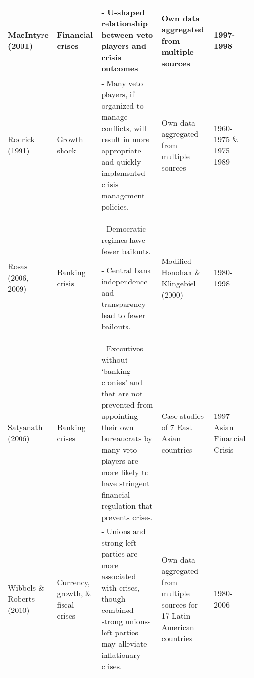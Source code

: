 \begin{tabular}{ m{2.5cm} m{1.75cm} m{6.25cm} m{2.5cm} m{1.75cm}}
    MacIntyre (2001) & Financial crises & - U-shaped relationship between veto players and crisis outcomes & Own data aggregated from multiple sources & 1997-1998 \\[0.25cm]\hline

    Rodrick (1991) & Growth shock & - Many veto players, if organized to manage conflicts, will result in more appropriate and quickly implemented crisis management policies. & Own data aggregated from multiple sources & 1960-1975 \& 1975-1989 \\[0.25cm]\hline

    Rosas (2006, 2009) & Banking crisis & - Democratic regimes have fewer bailouts.

    - Central bank independence and transparency lead to fewer bailouts. & Modified Honohan \& Klingebiel (2000) & 1980-1998 \\[0.25cm]\hline

    Satyanath (2006) & Banking crises & - Executives without `banking cronies' and that are not prevented from appointing their own bureaucrats by many veto players are more likely to have stringent financial regulation that prevents crises. & Case studies of 7 East Asian countries & 1997 Asian Financial Crisis \\[0.25cm]\hline

    Wibbels \& Roberts (2010) & Currency, growth, \& fiscal crises & - Unions and strong left parties are more associated with crises, though combined strong unions-left parties may alleviate inflationary crises. & Own data aggregated from multiple sources for 17 Latin American countries & 1980-2006 \\[0.25cm]\hline


    \hline
\end{tabular}
